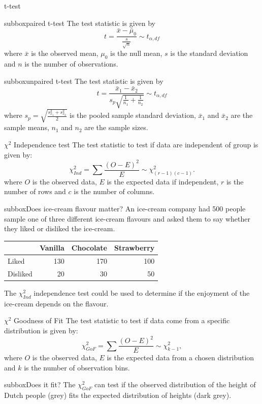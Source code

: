 \documentclass[10pt,a4paper]{article}
\begin{document}
\begin{multicols}{3}
\begin{textbox}{t-test}
\begin{subbox}{subbox}{paired t-test}
 The test statistic is given by  \[ t={\frac {{\bar {x}}-{\bar \mu_0}}{\frac{s}{\sqrt n}}} \sim t_{\alpha,df}\]
where $\bar{x}$ is the observed mean, $\mu_0$ is the null mean, $s$ is the standard deviation and $n$ is the number of observations.
\end{subbox}
\begin{subbox}{subbox}{unpaired t-test}
The test statistic is given by
\[ t={\frac {{\bar {x}}_{1}-{\bar {x}}_{2}}{s_{p}{\sqrt {\frac {1}{n_1}+\frac{1}{n_2}}}}} \sim t_{\alpha,df}\]
 where
$s_{p}={\sqrt{\frac {s_{x_{1}}^{2}+s_{x_{2}}^{2}}{2}}}$ is the pooled sample standard deviation, $\bar{x}_1$ and $\bar{x}_2$ are the sample means, $n_1$ and $n_2$ are the sample sizes.
\end{subbox}
\end{textbox}
\begin{textbox}{$\chi^2$ Independence test}
The test statistic to test if data are independent of group is given by:
   	\[\chi^2_{Ind}=\sum \frac{(O-E)^2}{E} \sim \chi^2_{(r-1)(c-1)}.\]
where $O$ is the observed data, $E$ is the expected data if independent, $r$ is the number of rows and $c$ is the number of columns.\\
\begin{subbox}{subbox}{Does ice-cream flavour matter?}
\tiny
An ice-cream company had 500 people sample one of three different ice-cream flavours and asked them to say whether they liked or disliked the ice-cream. 
\begin{center}
\begin{tabular}{|l|r|r|r|}
\hline
&Vanilla&Chocolate& Strawberry\\
\hline
Liked&130&170&100\\
\hline
Disliked&20&30&50\\
\hline
\end{tabular}
\end{center}
The $\chi^2_{Ind}$ independence test could be used to determine if the enjoyment of the ice-cream depends on the flavour.\\
\end{subbox}
\end{textbox}
\begin{textbox}{$\chi^2$ Goodness of Fit}
The test statistic to test if data come from a specific distribution is given by:
\[\chi^2_{GoF}=\sum \frac{(O-E)^2}{E} \sim\chi^2_{k-1},\]
where $O$ is the observed data, $E$ is the expected data from a chosen distribution and $k$ is the number of observation bins.
\begin{subbox}{subbox}{Does it fit?}
\tiny
The $\chi^2_{GoF}$ can test if the observed distribution of the height of Dutch people (grey) fits the expected distribution of heights (dark grey).


\end{subbox}
\end{textbox}
\end{multicols}
\end{document}
